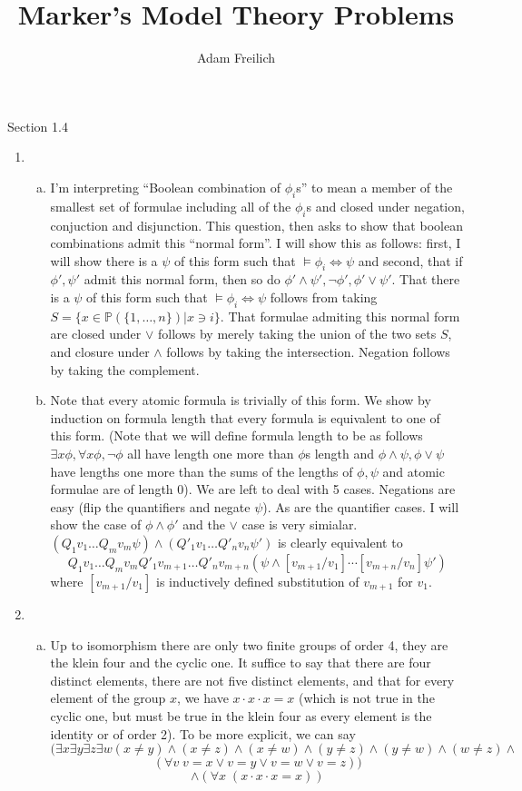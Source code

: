 \documentclass[10pt]{article}
\author{Adam Freilich}
\title{Marker's Model Theory Problems}
\newcommand{\A}{\forall}
\newcommand{\E}{\exists}
\begin{document}
\maketitle

Section 1.4

\begin{enumerate}[1.]
\item 
	\begin{enumerate}[a)] 
	\item I'm interpreting ``Boolean combination of $\phi_i$s'' to mean a member of the smallest set of formulae including all of the $\phi_i$s and closed under negation, conjuction and disjunction. This question, then asks to show that boolean combinations admit this ``normal form''. I will show this as follows: first, I will show there is a $\psi$ of this form such that $\models \phi_i \iff \psi$ and second, that if $\phi', \psi'$ admit this normal form, then so do $\phi' \land \psi', \neg \phi', \phi' \lor \psi'$. That there is a $\psi$ of this form such that $\models \phi_i \iff \psi$ follows from taking $S = \{x \in \mathbb{P}(\{1, \ldots, n\}) | x \ni i\}$. That formulae admiting this normal form are closed under $\lor$ follows by merely taking the union of the two sets $S$, and closure under $\land$ follows by taking the intersection. Negation follows by taking the complement. 
	
	\item Note that every atomic formula is trivially of this form. We show by induction on formula length that every formula is equivalent to one of this form. (Note that we will define formula length to be as follows $\E x \phi, \A x \phi, \neg \phi$ all have length one more than $\phi$s length and $\phi \land \psi, \phi \lor \psi$ have lengths one more than the sums of the lengths of $\phi, \psi$ and atomic formulae are of length 0). We are left to deal with 5 cases. Negations are easy (flip the quantifiers and negate $\psi$). As are the quantifier cases. I will show the case of $\phi \land \phi'$ and the $\lor$ case is very simialar. $(Q_1v_1\ldots Q_mv_m \psi ) \land ( Q'_1v_1\ldots Q'_nv_n \psi')$ is clearly equivalent to\[Q_1v_1\ldots Q_mv_mQ'_{1}v_{m+1}\ldots Q'_{n}v_{m+n} \left(\psi \land [v_{m+1}/v_1]\cdots[v_{m+n}/v_n]\psi'\right)\] where $[v_{m+1}/v_1]$ is inductively defined substitution of $v_{m+1}$ for $v_1$. 
	\end{enumerate}

\item  
	\begin{enumerate}[a)] 
	\item
	Up to isomorphism there are only two finite groups of order 4, they are the klein four and the cyclic one. It suffice to say that there are four distinct elements, there are not five distinct elements, and that for every element of the group $x$, we have $x \cdot x \cdot x = x$ (which is not true in the cyclic one, but must be true in the klein four as every element is the identity or of order 2). To be more explicit, we can say \[(\E x \E y \E z \E w (x \neq y) \land  (x \neq z)\land  (x \neq w)\land  (y \neq z)\land  (y \neq w) \land  (w \neq z) \land\]\[ (\A v \; v = x \lor v = y \lor v = w \lor v = z))\]\[ \land (\A x \; (x \cdot x \cdot x = x))\]
	

\end{enumerate}
\end{enumerate}
\end{document}
